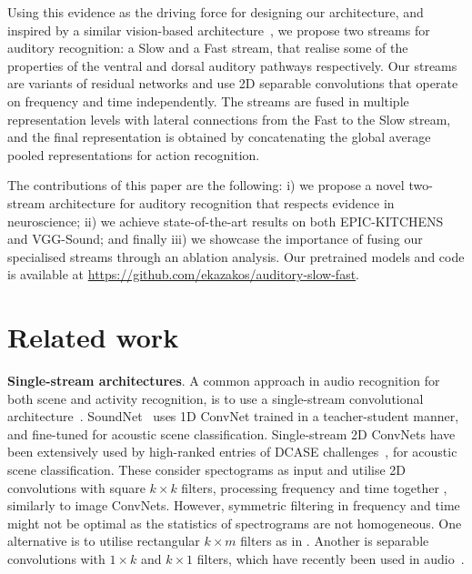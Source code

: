 \documentclass{article}
\begin{document}
Using this evidence as the driving force for designing our architecture, and inspired by a similar vision-based architecture~\cite{Feichtenhofer_2019_ICCV}, we propose two streams for auditory recognition: a Slow and a Fast stream, that realise some of the properties of the ventral and dorsal auditory pathways respectively. 
Our streams are variants of residual networks and use 2D separable convolutions that operate on frequency and time independently. 
The streams are fused in multiple representation levels with lateral connections from the Fast to the Slow stream, and the final representation is obtained by concatenating the global average pooled representations for action recognition. 

The contributions of this paper are the following: i) we propose a novel two-stream architecture for auditory recognition that respects evidence in neuroscience; ii) we achieve state-of-the-art results on both EPIC-KITCHENS and  VGG-Sound; and finally iii) we showcase the importance of fusing our specialised streams through an ablation analysis. Our pretrained models and code is available at \url{https://github.com/ekazakos/auditory-slow-fast}.

\section{Related work}
\label{sec:related}

\textbf{Single-stream architectures}. A common approach in audio recognition for both scene and activity recognition, is to use a single-stream convolutional architecture~\cite{Salamon2017,Hershey2017, soundnet}. 
SoundNet~\cite{soundnet} uses 1D ConvNet trained in a teacher-student manner, and fine-tuned for acoustic scene classification. Single-stream 2D ConvNets have been extensively used by high-ranked entries of DCASE challenges~\cite{Suh2020,Hu2020,KoutiniEDW19,Chen2019,Dorfer2018,Liping2018}, for acoustic scene classification.
These consider spectograms as input and utilise 2D convolutions with square $k\times k$ filters, processing frequency and time together \cite{Salamon2017,Hershey2017, Suh2020,Hu2020,KoutiniEDW19,Chen2019,Dorfer2018,Liping2018}, similarly to image ConvNets. However, symmetric filtering in frequency and time might not be optimal as the statistics of spectrograms are not homogeneous. 
One alternative is to utilise rectangular $k \times m$ filters as in \cite{pons2017,Huzaifah17}.
Another is separable convolutions with $1\times k$ and $k\times 1$ filters, which have recently been used in audio~\cite{xiao2020audiovisual,dap}. 
\end{document}
